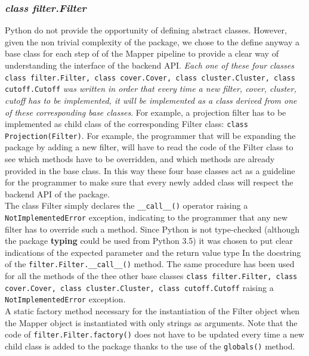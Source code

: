 \subsubsection{\textit{class filter.Filter}} \label{subsubsection:class filter.Filter}
Python do not provide the opportunity of defining abstract classes. However, given the non trivial complexity of the package, we chose to the define anyway a base class for each step of of the Mapper pipeline to provide a clear way of understanding the interface of the backend API. \textit{Each one of these four classes} \lstinline{class filter.Filter, class cover.Cover, class cluster.Cluster, class cutoff.Cutoff} \textit{was written in order that every time a new filter, cover, cluster, cutoff has to be implemented, it will be implemented as a class derived from one of these corresponding base classes}. For example, a projection filter has to be implemented as child class of the corresponding Filter class: \lstinline|class Projection(Filter)|. For example, the programmer that will be expanding the package by adding a new filter, will have to read the code of the Filter class to see which methods have to be overridden, and which methods are already provided in the base class. In this way these four base classes act as a guideline for the programmer to make sure that every newly added class will respect the backend API of the package.\\The class Filter simply declares the \lstinline{__call__()} operator raising a \lstinline{NotImplementedError} exception, indicating to the programmer that any new filter has to override such a method. Since Python is not type-checked (although the package \textbf{typing} could be used from Python 3.5) it was chosen to put clear indications of the expected parameter and the return value type In the docstring of the \lstinline{filter.Filter.__call__()} method. The same procedure has been used for all the methods of the thee other base classes \lstinline{class filter.Filter, class cover.Cover, class cluster.Cluster, class cutoff.Cutoff} raising a \lstinline{NotImplementedError} exception.\\ A static factory method necessary for the instantiation of the Filter object when the Mapper object is instantiated with only strings as arguments. Note that the code of \lstinline{filter.Filter.factory()} does not have to be updated every time a new child class is added to the package thanks to the use of the \lstinline{globals()} method.

